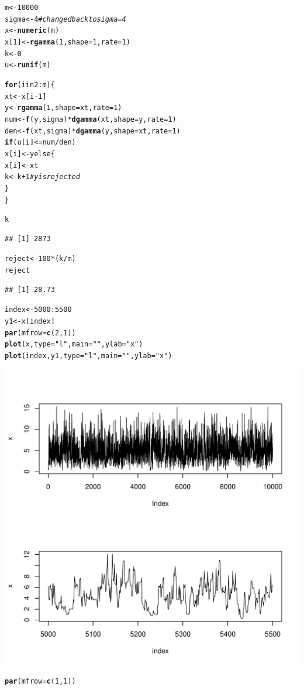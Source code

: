 \documentclass{article}\usepackage[]{graphicx}\usepackage[]{color}
\makeatletter
\def\maxwidth{ %
  \ifdim\Gin@nat@width>\linewidth
    \linewidth
  \else
    \Gin@nat@width
  \fi
}
\newcommand{\hlstr}[1]{\textcolor[rgb]{0.192,0.494,0.8}{#1}}%
\newcommand{\hlcom}[1]{\textcolor[rgb]{0.678,0.584,0.686}{\textit{#1}}}%
\newcommand{\hlkwd}[1]{\textcolor[rgb]{0.737,0.353,0.396}{\textbf{#1}}}%
\newenvironment{kframe}{%
 \def\at@end@of@kframe{}%
 \ifinner\ifhmode%
  \def\at@end@of@kframe{\end{minipage}}%
  \begin{minipage}{\columnwidth}%
 \fi\fi%
 \def\FrameCommand##1{\hskip\@totalleftmargin \hskip-\fboxsep
 \colorbox{shadecolor}{##1}\hskip-\fboxsep
     \hskip-\linewidth \hskip-\@totalleftmargin \hskip\columnwidth}%
 \MakeFramed {\advance\hsize-\width
   \@totalleftmargin\z@ \linewidth\hsize
   \@setminipage}}%
 {\par\unskip\endMakeFramed%
 \at@end@of@kframe}
\newenvironment{knitrout}{}{} %
\makeatother
\begin{document}
\begin{itemize}
\begin{knitrout}
\begin{kframe}
\begin{alltt}
m <- 10000
sigma <- 4  \hlcom{#changed back to sigma=4}
x <- \hlkwd{numeric}(m)
x[1] <- \hlkwd{rgamma}(1, shape = 1, rate = 1)
k <- 0
u <- \hlkwd{runif}(m)

\hlkwd{for} (i in 2:m) \{
    xt <- x[i - 1]
    y <- \hlkwd{rgamma}(1, shape = xt, rate = 1)
    num <- \hlkwd{f}(y, sigma) * \hlkwd{dgamma}(xt, shape = y, rate = 1)
    den <- \hlkwd{f}(xt, sigma) * \hlkwd{dgamma}(y, shape = xt, rate = 1)
    \hlkwd{if} (u[i] <= num/den) 
        x[i] <- y else \{
        x[i] <- xt
        k <- k + 1  \hlcom{#y is rejected}
    \}
\}

k
\end{alltt}
\begin{verbatim}
## [1] 2873
\end{verbatim}
\begin{alltt}

reject <- 100 * (k/m)
reject
\end{alltt}
\begin{verbatim}
## [1] 28.73
\end{verbatim}
\begin{alltt}

index <- 5000:5500
y1 <- x[index]
\hlkwd{par}(mfrow = \hlkwd{c}(2, 1))
\hlkwd{plot}(x, type = \hlstr{"l"}, main = \hlstr{""}, ylab = \hlstr{"x"})
\hlkwd{plot}(index, y1, type = \hlstr{"l"}, main = \hlstr{""}, ylab = \hlstr{"x"})
\end{alltt}
\end{kframe}
\includegraphics[width=\maxwidth]{figure/nine2} 
\begin{kframe}\begin{alltt}
\hlkwd{par}(mfrow = \hlkwd{c}(1, 1))
\end{alltt}
\end{kframe}
\end{knitrout}


\end{itemize}
\end{document}

